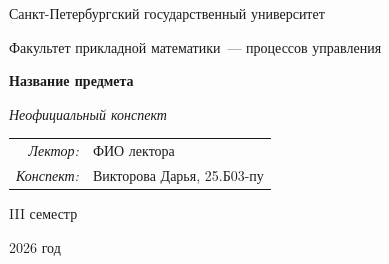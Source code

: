 \begin{titlepage}
    \thispagestyle{empty}
    \begin{center}
        \vspace*{0.6cm}

        {\large Санкт-Петербургский государственный университет\par}
        \vspace{0.35em}
        {\normalsize Факультет прикладной математики~--- процессов управления\par}

        \vspace*{5.1cm}

        {\fontsize{30}{35}\selectfont\bfseries Название предмета\par}
        \vspace{0.65em}
        {\fontsize{17}{21}\selectfont\itshape Неофициальный конспект\par}

        \vspace{2.7cm}

        {\normalsize
        \begin{tabular}{@{}rl@{}}
            \textit{Лектор:} & ФИО лектора \\
            \textit{Конспект:} & Викторова Дарья, 25.Б03-пу
        \end{tabular}\par}

        \vfill

        {\large III семестр\par}
        \vspace{0.22em}
        {\large 2026 год\par}
        \vspace*{0.55cm}
    \end{center}
\end{titlepage}

\tableofcontents
\newpage

\setcounter{lection}{0}



